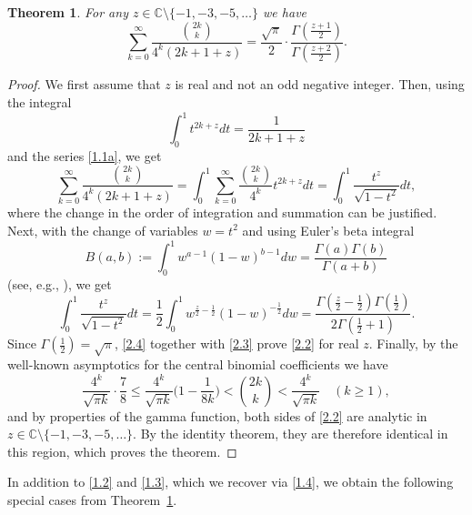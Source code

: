 \documentclass{amsart}
\newtheorem{theorem}{Theorem}[section]
\theoremstyle{definition}
\theoremstyle{remark}
\numberwithin{equation}{section}
\begin{document}
\begin{theorem}\label{thm:2.1}
For any $z\in{\mathbb C}\setminus\{-1,-3,-5,\ldots\}$ we have
\begin{equation}\label{2.2}
\sum_{k=0}^\infty\frac{\binom{2k}{k}}{4^k(2k+1+z)}
=\frac{\sqrt{\pi}}{2}\cdot\frac{\Gamma(\frac{z+1}{2})}{\Gamma(\frac{z+2}{2})}.
\end{equation}
\end{theorem}

\begin{proof}
We first assume that $z$ is real and not an odd negative integer. Then, using
the integral 
\[
\int_0^1 t^{2k+z}dt = \frac{1}{2k+1+z}
\]
and the series \eqref{1.1a}, we get
\begin{equation}\label{2.3}
\sum_{k=0}^\infty\frac{\binom{2k}{k}}{4^k(2k+1+z)}
=\int_0^1\sum_{k=0}^\infty\frac{\binom{2k}{k}}{4^k}t^{2k+z}dt 
=\int_0^1\frac{t^z}{\sqrt{1-t^2}}dt,
\end{equation}
where the change in the order of integration and summation can be justified.
Next, with the change of variables $w=t^2$ and using Euler's beta integral
\begin{equation}\label{2.3a}
B(a,b):=\int_0^1 w^{a-1}(1-w)^{b-1}dw = \frac{\Gamma(a)\Gamma(b)}{\Gamma(a+b)}
\end{equation}
(see, e.g., \cite[eq.~5.12.1]{DLMF}), we get
\begin{equation}\label{2.4}
\int_0^1\frac{t^z}{\sqrt{1-t^2}}dt
=\frac{1}{2}\int_0^1 w^{\frac{z}{2}-\frac{1}{2}}(1-w)^{-\frac{1}{2}}dw
=\frac{\Gamma(\frac{z}{2}-\frac{1}{2})\Gamma(\frac{1}{2})}{2\Gamma(\frac{1}{2}+1)}.
\end{equation}
Since $\Gamma(\frac{1}{2})=\sqrt{\pi}$, \eqref{2.4} together with \eqref{2.3}
prove \eqref{2.2} for real $z$. Finally, by the well-known asymptotics for 
the central binomial coefficients we have
\begin{equation}\label{2.5}
\frac{4^k}{\sqrt{\pi k}}\cdot\frac{7}{8}
\leq\frac{4^k}{\sqrt{\pi k}}\bigl(1-\frac{1}{8k}\bigr) < \binom{2k}{k}
< \frac{4^k}{\sqrt{\pi k}}\quad (k\geq 1),
\end{equation}
and by properties of the gamma function, both sides of \eqref{2.2} are 
analytic in $z\in{\mathbb C}\setminus\{-1,-3,-5,\ldots\}$. By the identity 
theorem, they are therefore identical in this region, which proves the theorem.
\end{proof}

In addition to \eqref{1.2} and \eqref{1.3}, which we recover via \eqref{1.4}, 
we obtain the following special cases from Theorem~\ref{thm:2.1}.
\end{document}
